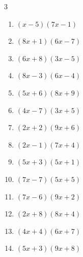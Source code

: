 \begin{multicols}{3}
\begin{enumerate}

  \item $(x-5)(7x-1)$


  \item $(8x+1)(6x-7)$


  \item $(6x+8)(3x-5)$


  \item $(8x-3)(6x-4)$


  \item $(5x+6)(8x+9)$


  \item $(4x-7)(3x+5)$


\columnbreak %

  \item $(2x+2)(9x+6)$


  \item $(2x-1)(7x+4)$


  \item $(5x+3)(5x+1)$


  \item $(7x-7)(5x+5)$


  \item $(7x-6)(9x+2)$


  \item $(2x+8)(8x+4)$


  \item $(4x+4)(6x+7)$


  \item $(5x+3)(9x+8)$



\end{enumerate}
\end{multicols}
